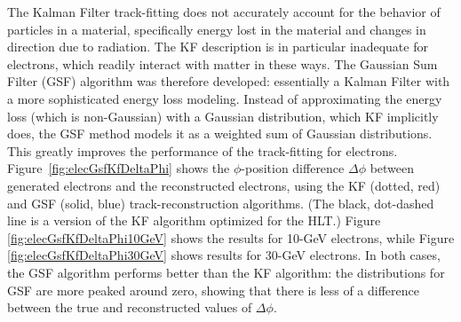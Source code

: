 The Kalman Filter track-fitting does not accurately 
account for the behavior of particles in a material, 
specifically energy lost in the material 
and changes in direction due to radiation.  
The KF description is in particular inadequate 
for electrons, which 
readily interact with matter in these ways.  
The Gaussian Sum Filter (GSF) algorithm 
\cite{CMS-NOTE-2005-001} was 
therefore developed:
essentially a Kalman Filter 
with a more sophisticated energy loss modeling.   
Instead of approximating the energy loss 
(which is non-Gaussian)
with a Gaussian distribution, 
which KF implicitly does, 
the GSF method models it as a 
weighted sum of Gaussian distributions.  
This greatly improves the performance 
of the track-fitting for electrons.  
Figure~\ref{fig:elecGsfKfDeltaPhi} shows the 
$\phi$-position difference $\Delta\phi$
between generated electrons 
and the reconstructed electrons, using 
the KF (dotted, red) and GSF (solid, blue) 
track-reconstruction algorithms.  
(The black, dot-dashed line is a version of the 
KF algorithm optimized for the HLT.)  
Figure \ref{fig:elecGsfKfDeltaPhi10GeV} shows the results 
for 10-GeV electrons, while 
Figure \ref{fig:elecGsfKfDeltaPhi30GeV} shows results for 
30-GeV electrons.  
In both cases, the GSF algorithm performs better 
than the KF algorithm: 
the distributions for GSF are more peaked around zero, 
showing that there is less of a difference 
between the true and reconstructed values of $\Delta\phi$. 

